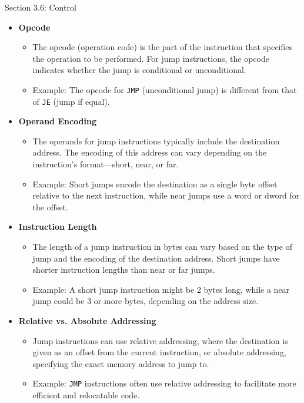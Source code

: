 \begin{notes}{Section 3.6: Control}
    \begin{itemize}
        \item \textbf{Opcode}
        \begin{itemize}
            \item The opcode (operation code) is the part of the instruction that specifies the operation to be performed. For jump instructions, the opcode indicates whether the jump is conditional 
            or unconditional.
            \item Example: The opcode for \texttt{JMP} (unconditional jump) is different from that of \texttt{JE} (jump if equal).
        \end{itemize}
        \item \textbf{Operand Encoding}
        \begin{itemize}
            \item The operands for jump instructions typically include the destination address. The encoding of this address can vary depending on the instruction's format—short, near, or far.
            \item Example: Short jumps encode the destination as a single byte offset relative to the next instruction, while near jumps use a word or dword for the offset.
        \end{itemize}
        \item \textbf{Instruction Length}
        \begin{itemize}
            \item The length of a jump instruction in bytes can vary based on the type of jump and the encoding of the destination address. Short jumps have shorter instruction lengths than near or 
            far jumps.
            \item Example: A short jump instruction might be 2 bytes long, while a near jump could be 3 or more bytes, depending on the address size.
        \end{itemize}
        \item \textbf{Relative vs. Absolute Addressing}
        \begin{itemize}
            \item Jump instructions can use relative addressing, where the destination is given as an offset from the current instruction, or absolute addressing, specifying the exact memory address 
            to jump to.
            \item Example: \texttt{JMP} instructions often use relative addressing to facilitate more efficient and relocatable code.

\end{itemize}
\end{itemize}
\end{notes}
